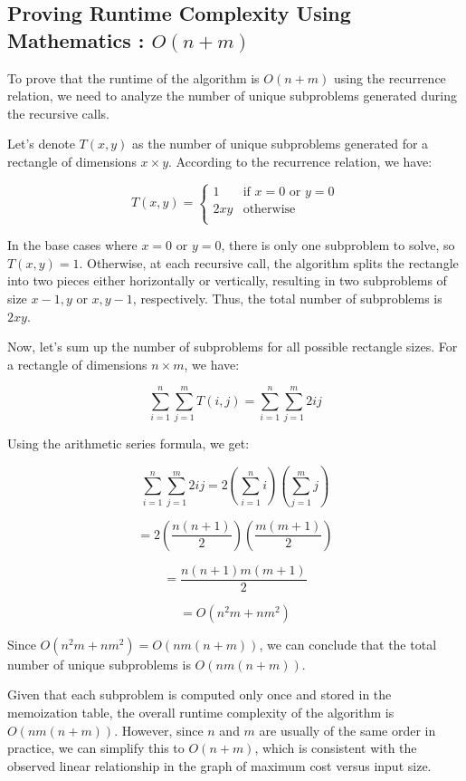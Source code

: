 \documentclass{article}
\begin{document}
\subsection{Proving Runtime Complexity Using Mathematics : \(O(n + m)\)}

To prove that the runtime of the algorithm is \(O(n + m)\) using the recurrence relation, we need to analyze the number of unique subproblems generated during the recursive calls.

Let's denote \(T(x, y)\) as the number of unique subproblems generated for a rectangle of dimensions \(x \times y\). According to the recurrence relation, we have:

\[
T(x, y) = \begin{cases} 
1 & \text{if } x = 0 \text{ or } y = 0 \\
2xy & \text{otherwise} \\
\end{cases} 
\]

In the base cases where \(x = 0\) or \(y = 0\), there is only one subproblem to solve, so \(T(x, y) = 1\). Otherwise, at each recursive call, the algorithm splits the rectangle into two pieces either horizontally or vertically, resulting in two subproblems of size \(x-1, y\) or \(x, y-1\), respectively. Thus, the total number of subproblems is \(2xy\).

Now, let's sum up the number of subproblems for all possible rectangle sizes. For a rectangle of dimensions \(n \times m\), we have:

\[
\sum_{i=1}^{n} \sum_{j=1}^{m} T(i, j) = \sum_{i=1}^{n} \sum_{j=1}^{m} 2ij
\]

Using the arithmetic series formula, we get:

\[
\sum_{i=1}^{n} \sum_{j=1}^{m} 2ij = 2 \left( \sum_{i=1}^{n} i \right) \left( \sum_{j=1}^{m} j \right)
\]

\[
= 2 \left( \frac{n(n+1)}{2} \right) \left( \frac{m(m+1)}{2} \right)
\]

\[
= \frac{n(n+1)m(m+1)}{2}
\]

\[
= O(n^2m + nm^2)
\]

Since \(O(n^2m + nm^2) = O(nm(n+m))\), we can conclude that the total number of unique subproblems is \(O(nm(n+m))\).

Given that each subproblem is computed only once and stored in the memoization table, the overall runtime complexity of the algorithm is \(O(nm(n+m))\). However, since \(n\) and \(m\) are usually of the same order in practice, we can simplify this to \(O(n + m)\), which is consistent with the observed linear relationship in the graph of maximum cost versus input size.
\end{document}
